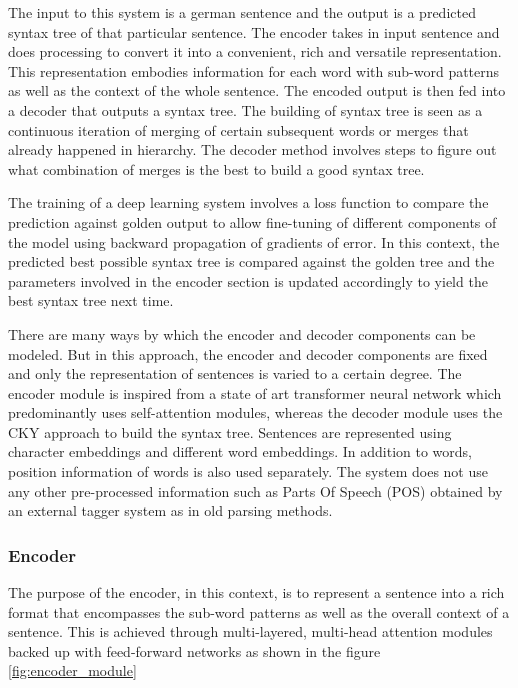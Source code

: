 \documentclass[a4paper, 11pt]{article}
\begin{document}
The input to this system is a german sentence and the output is a predicted syntax tree of that particular sentence. The encoder takes in input sentence and does processing to convert it into a convenient, rich and versatile representation. This representation embodies information for each word with sub-word patterns as well as the context of the whole sentence. The encoded output is then fed into a decoder that outputs a syntax tree. The building of syntax tree is seen as a continuous iteration of merging of certain subsequent words or merges that already happened in hierarchy. The decoder method involves steps to figure out what combination of merges is the best to build a good syntax tree.

The training of a deep learning system involves a loss function to compare the prediction against golden output to allow fine-tuning of different components of the model using backward propagation of gradients of error. In this context, the predicted best possible syntax tree is compared against the golden tree and the parameters involved in the encoder section is updated accordingly to yield the best syntax tree next time. 

There are many ways by which the encoder and decoder components can be modeled. But in this approach, the encoder and decoder components are fixed and only the representation of sentences is varied to a certain degree. The encoder module is inspired from a state of art transformer neural network which predominantly uses self-attention modules, whereas the decoder module uses the CKY approach to build the syntax tree. Sentences are represented using character embeddings and different word embeddings. In addition to words, position information of words is also used separately. The system does not use any other pre-processed information such as Parts Of Speech (POS) obtained by an external tagger system as in old parsing methods.

\subsubsection{Encoder}

The purpose of the encoder, in this context, is to represent a sentence into a rich format that encompasses the sub-word patterns as well as the overall context of a sentence. This is achieved through multi-layered, multi-head attention modules backed up with feed-forward networks as shown in the figure \ref{fig:encoder_module}
\end{document}
